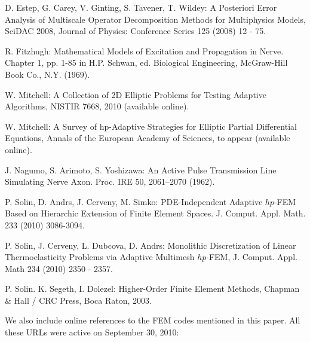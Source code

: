 \begin{thebibliography}{[KLR73]}

D. Estep, G. Carey, V. Ginting, S. Tavener, T. Wildey:
A Posteriori Error Analysis of Multiscale Operator
Decomposition Methods for Multiphysics Models, SciDAC 2008,
Journal of Physics: Conference Series 125 (2008) 12 - 75.

R. Fitzhugh: Mathematical Models of Excitation and Propagation in Nerve.
Chapter 1, pp. 1-85 in H.P. Schwan, ed. Biological Engineering,
McGraw-Hill Book Co., N.Y. (1969).

W. Mitchell: A Collection of 2D Elliptic Problems for
Testing Adaptive Algorithms, NISTIR 7668, 2010 (available online).

W. Mitchell: A Survey of hp-Adaptive Strategies for Elliptic Partial Differential Equations,
Annals of the European Academy of Sciences, to appear (available online).

J. Nagumo, S. Arimoto, S. Yoshizawa:
An Active Pulse Transmission Line Simulating Nerve Axon. Proc. IRE 50, 2061–2070 (1962).

P. Solin, D. Andrs, J. Cerveny, M. Simko:
PDE-Independent Adaptive $hp$-FEM Based on Hierarchic Extension of Finite Element Spaces.
J. Comput. Appl. Math. 233 (2010) 3086-3094.

P. Solin, J. Cerveny, L. Dubcova, D. Andrs:
Monolithic Discretization of Linear Thermoelasticity Problems
via Adaptive Multimesh $hp$-FEM, J. Comput. Appl. Math 234 (2010) 2350 - 2357.

P. Solin. K. Segeth, I. Dolezel: Higher-Order Finite Element Methods, Chapman \& Hall
/ CRC Press, Boca Raton, 2003.
\end{thebibliography}

\vbox{}
\vspace{6mm}
We also include online references to the FEM codes mentioned in this paper.
All these URLs were active on September 30, 2010:

